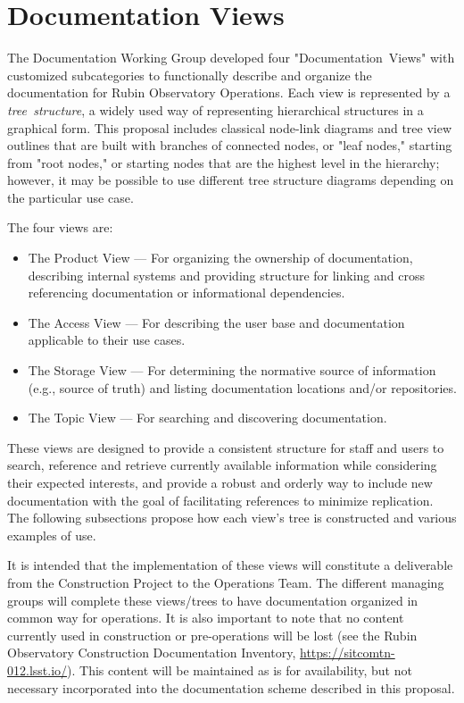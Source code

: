 \section{Documentation Views}
\label{sec:views}

The Documentation Working Group developed four "Documentation~Views" with customized subcategories to functionally describe and organize the documentation for Rubin Observatory Operations.
Each view is represented by a \emph{tree~structure}, a widely used way of representing hierarchical structures in a graphical form.
This proposal includes classical node-link diagrams and tree view outlines that are built with branches of connected nodes, or "leaf nodes,"
starting from "root nodes," or starting nodes that are the highest level in the hierarchy;
however, it may be possible to use different tree structure diagrams depending on the particular use case.
\citep{wiki-tree-diagram-cite}

The four views are:

\begin{itemize}

\item The Product View --- For organizing the ownership of documentation, describing internal systems and providing structure for linking and cross referencing documentation or informational dependencies.
\item The Access View --- For describing the user base and documentation applicable to their use cases.
\item The Storage View --- For determining the normative source of information (e.g., source of truth) and listing documentation locations and/or repositories.
\item The Topic View --- For searching and discovering documentation.

\end{itemize}
 
These views are designed to provide a consistent structure for staff and users to search, reference and retrieve currently available information while considering their expected interests,
and provide a robust and orderly way to include new documentation with the goal of facilitating references to minimize replication.
The following subsections propose how each view's tree is constructed and various examples of use.

It is intended that the implementation of these views will constitute a deliverable from the Construction Project to the Operations Team.
The different managing groups will complete these views/trees to have documentation organized in common way for operations.
It is also important to note that no content currently used in construction or pre-operations will be lost
(see the Rubin Observatory Construction Documentation Inventory, \url{https://sitcomtn-012.lsst.io/}).
This content will be maintained as is for availability,
but not necessary incorporated into the documentation scheme described in this proposal.
